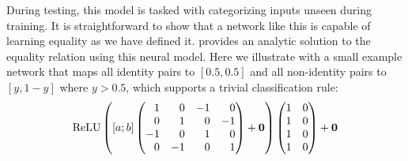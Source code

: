 \documentclass[9pt,twocolumn,twoside,lineno]{pnas-new}
\newcommand{\update}[1]{{\color{darkblue}#1}}
\DeclareMathOperator{\ReLU}{ReLU}
\begin{document}
During testing, this model is tasked with categorizing inputs unseen during training.  It is straightforward to show that a network like this is capable of learning equality as we have defined it.  provides an analytic solution to the equality relation using this neural model.  \update{Here we illustrate with a small example network that maps all identity pairs to $[0.5, 0.5]$ and all non-identity pairs to $[y, 1-y]$ where $y > 0.5$, which supports a trivial classification rule:
%
\setlength{\arraycolsep}{4pt}
\begin{equation}
  \ReLU\left(
    [a;b]
    \left(
      \begin{array}[c]{@{} *{4}{r} @{}}
        1 &  0 &  -1 & 0  \\
        0 &  1 &  0 & -1 \\
        -1 &  0 &  1 & 0  \\
        0 &  -1 &  0 & 1
      \end{array}
    \right)
    +
    \mathbf{0}
  \right)
  \left(
    \begin{array}[c]{@{} r r @{}}
      1 & 0 \\
      1 & 0\\
      1 & 0\\
      1 & 0\\
    \end{array}
  \right)
  +
  \mathbf{0}
\end{equation}}
\end{document}
